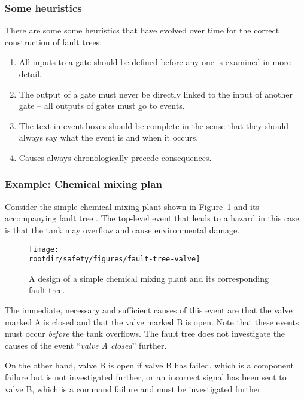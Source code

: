 \subsubsection*{Some heuristics}

There are some some heuristics that have evolved over time for the correct construction of fault trees:

\begin{enumerate}

\item All inputs to a gate should be defined before any one is examined
in more detail.

\item The output of a gate must never be directly linked to the input of
another gate -- all outputs of gates must go to events.

\item The text in event boxes should be complete in the sense that they
should always say what the event is and when it occurs.

\item Causes always chronologically precede consequences.

\end{enumerate}


\subsubsection*{Example: Chemical mixing plan}

Consider the simple chemical mixing plant shown in Figure~\ref{fig:FT-valve} and its accompanying fault tree \cite{mcdermid1995experience}.  The top-level event that leads to a hazard in this case is that the tank may overflow and cause environmental damage.

\begin{figure}[!h]
  \centering
  \texttt{[image: \\rootdir/safety/figures/fault-tree-valve]}
  \caption{A design of a simple chemical mixing plant and its corresponding fault tree.}
  \label{fig:FT-valve}
\end{figure}


The immediate, necessary and sufficient causes of this event are that the valve marked A is closed and that the valve marked B is open. Note that these events must occur \emph{before} the tank overflows. The fault tree does not investigate the causes of the event ``\emph{valve A closed}'' further.

On the other hand, valve B is open if valve B has failed, which is a component failure but is not investigated further, or an incorrect signal has been sent to valve B, which is a command failure and must be investigated further.


